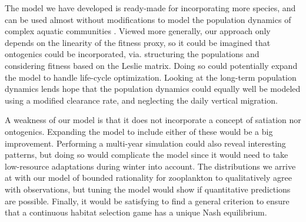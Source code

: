 


The model we have developed is ready-made for incorporating more species, and can be used almost without modifications to model the population dynamics of complex aquatic communities \citep{pinti2019trophic}. Viewed more generally, our approach only depends on the linearity of the fitness proxy, so it could be imagined that ontogenics could be incorporated, via. structuring the populations and considering fitness based on the Leslie matrix. Doing so could potentially expand the model to handle life-cycle optimization. Looking at the long-term population dynamics lends hope that the population dynamics could equally well be modeled using a modified clearance rate, and neglecting the daily vertical migration.


A weakness of our model is that it does not incorporate a concept of satiation nor ontogenics. Expanding the model to include either of these would be a big improvement. Performing a multi-year simulation could also reveal interesting patterns, but doing so would complicate the model since it would need to take low-resource adaptations during winter into account. The distributions we arrive at with our model of bounded rationality for zooplankton to qualitatively agree with observations, but tuning the model would show if quantitative predictions are possible. Finally, it would be satisfying to find a general criterion to ensure that a continuous habitat selection game has a unique Nash equilibrium.


